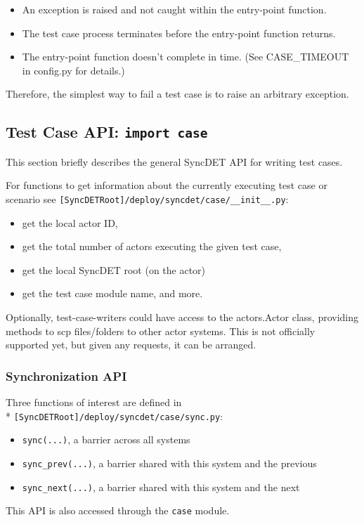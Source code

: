 \begin{itemize}
\item An exception is raised and not caught within the entry-point function.
\item The test case process terminates before the entry-point function returns.
\item The entry-point function doesn't complete in time. (See CASE\_TIMEOUT
in config.py for details.)
\end{itemize}

Therefore, the simplest way to fail a test case is to raise an arbitrary exception.

\subsection{Test Case API: {\tt import case}}

This section briefly describes the general SyncDET API for writing test cases.

For functions to get information about the currently executing test case or
scenario see {\tt [SyncDETRoot]/deploy/syncdet/case/\_\_init\_\_.py}:
\begin{itemize}
\item get the local actor ID,
\item get the total number of actors executing the given test case,
\item get the local SyncDET root (on the actor)
\item get the test case module name, and more.
\end{itemize}

Optionally, test-case-writers could have access to the actors.Actor class,
providing methods to scp files/folders to other actor systems. This is not
officially supported yet, but given any requests, it can be arranged.

\subsubsection{Synchronization API}

Three functions of interest are defined in \\*
{\tt [SyncDETRoot]/deploy/syncdet/case/sync.py}:
\begin{itemize}
\item {\tt sync(...)}, a barrier across all systems
\item {\tt sync\_prev(...)}, a barrier shared with this system and the previous
\item {\tt sync\_next(...)}, a barrier shared with this system and the next
\end{itemize}
This API is also accessed through the {\tt case} module.


